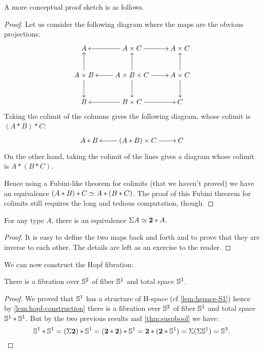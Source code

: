 A more conceptual proof sketch is as follows.

\begin{proof}
  Let us consider the following diagram where the maps are the obvious
  projections:
  \[\xymatrix{
    A & A\times C \ar[l] \ar[r] & A\times C\\
    A\times B \ar[u] \ar[d] & A\times B\times C \ar[l]\ar[u]\ar[r]\ar[d] &
    A\times C \ar[u] \ar[d] \\
    B & B\times C \ar[l] \ar[r] & C}\]
  Taking the colimit of the columns gives the following
  diagram, whose colimit is $(A*B)*C$:
  \[\xymatrix{A*B & (A*B)\times C \ar[l]\ar[r] & C}\]
  On the other hand, taking the colimit of the lines gives a diagram whose
  colimit is $A*(B*C)$.

  Hence using a Fubini-like theorem for colimits (that we haven’t proved) we
  have an equivalence $(A*B)*C \simeq A*(B*C)$. The proof of this Fubini theorem
  for colimits still requires the long and tedious computation, though.
\end{proof}

\begin{lem}
  For any type $A$, there is an equivalence $\Sigma A \simeq \mathbf{2}*A$.
\end{lem}

\begin{proof}
  It is easy to define the two maps back and forth and to prove that they are
  inverse to each other. The details are left as an exercise to the reader.
\end{proof}

We can now construct the Hopf fibration:

\begin{thm}
  There is a fibration over $\mathbb{S}^2$ of fiber $\mathbb{S}^1$ and total space $\mathbb{S}^3$.
\end{thm}
\begin{proof}
  We proved that $\mathbb{S}^1$ has a structure of H-space (cf \autoref{lem:hspace-S1})
  hence by \autoref{lem:hopf-construction} there is a fibration over $\mathbb{S}^2$ of
  fiber $\mathbb{S}^1$ and total space $\mathbb{S}^1*\mathbb{S}^1$. But by the two previous results
  and \autoref{thm:suspbool} we have:
  \begin{equation*}
    \mathbb{S}^1*\mathbb{S}^1 = (\Sigma\mathbf{2})*\mathbb{S}^1
    =(\mathbf{2}*\mathbf{2})*\mathbb{S}^1
    =\mathbf{2}*(\mathbf{2}*\mathbb{S}^1)
    =\Sigma(\Sigma\mathbb{S}^1)
    =\mathbb{S}^3. \qedhere
  \end{equation*}
\end{proof}


